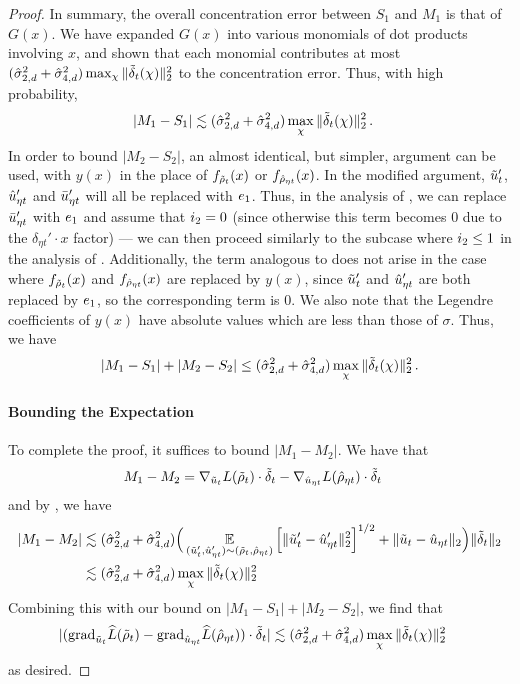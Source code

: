 \begin{proof}
In summary, the overall concentration error between $S_1$ and $M_1$ is that of $G(x)$. We have expanded $G(x)$ into various monomials of dot products involving $x$, and shown that each monomial contributes at most $(\hat{\sigma}_{2, d}^2 + \hat{\sigma}_{4, d}^2) \max_\chi \|{\tilde{\delta}}_t(\chi)\|_2^2$ to the concentration error. Thus, with high probability,
\begin{align}
|M_1 - S_1|
& \lesssim (\hat{\sigma}_{2, d}^2 + \hat{\sigma}_{4, d}^2) \max_\chi \|{\tilde{\delta}}_t(\chi)\|_2^2 \,.
\end{align}
In order to bound $|M_2 - S_2|$, an almost identical, but simpler, argument can be used, with $y(x)$ in the place of $f_{{\tilde{\rho}}_t}(x)$ or $f_{{\hat{\rho}}_{\eta t}}(x)$. In the modified argument, $\tilde{u}_t'$, $\hat{u}_{\eta t}'$ and $\bar{u}_{\eta t}'$ will all be replaced with $e_1$. Thus, in the analysis of , we can replace $\bar{u}_{\eta t}'$ with $e_1$ and assume that $i_{2} = 0$ (since otherwise this term becomes $0$ due to the $\delta_{\eta t}' \cdot x$ factor) --- we can then proceed similarly to the subcase where $i_{2} \leq 1$ in the analysis of . Additionally, the term analogous to  does not arise in the case where $f_{{\tilde{\rho}}_t}(x)$ and $f_{{\hat{\rho}}_{\eta t}}(x)$ are replaced by $y(x)$, since $\tilde{u}_t'$ and $\hat{u}_{\eta t}'$ are both replaced by $e_1$, so the corresponding term is $0$. We also note that the Legendre coefficients of $y(x)$ have absolute values which are less than those of $\sigma$. Thus, we have
\begin{align}
|M_1 - S_1| + |M_2 - S_2| \leq (\hat{\sigma}_{2, d}^2 + \hat{\sigma}_{4, d}^2) \max_\chi \|{\tilde{\delta}}_t(\chi)\|_2^2 \,.
\end{align}
\paragraph{Bounding the Expectation} To complete the proof, it suffices to bound $|M_1 - M_2|$. We have that
\begin{align}
M_1 - M_2
& = \nabla_{\tilde{u}_t} L({\tilde{\rho}}_t) \cdot {\tilde{\delta}}_t - \nabla_{\hat{u}_{\eta t}} L({\hat{\rho}}_{\eta t}) \cdot {\tilde{\delta}}_t
\end{align}
and by , we have
\begin{align}
|M_1 - M_2|
& \lesssim (\hat{\sigma}_{2, d}^2 + \hat{\sigma}_{4, d}^2) \Big(\operatorname*{\mathbb{E}}_{(\tilde{u}_t', \hat{u}_{\eta t}') \sim ({\tilde{\rho}}_t, {\hat{\rho}}_{\eta t})} \Big[\|\tilde{u}_t' - \hat{u}_{\eta t}'\|_2^2\Big]^{1/2} + \|\tilde{u}_t - \hat{u}_{\eta t}\|_2 \Big) \|{\tilde{\delta}}_t\|_2 \\
& \lesssim (\hat{\sigma}_{2, d}^2 + \hat{\sigma}_{4, d}^2) \max_\chi \|{\tilde{\delta}}_t (\chi)\|_2^2
\end{align}
Combining this with our bound on $|M_1 - S_1| + |M_2 - S_2|$, we find that
\begin{align}
|({\textup{grad}}_{\tilde{u}_t} \widehat{L}({\tilde{\rho}}_t) - {\textup{grad}}_{\hat{u}_{\eta t}} \widehat{L}({\hat{\rho}}_{\eta t})) \cdot {\tilde{\delta}}_t|
& \lesssim (\hat{\sigma}_{2, d}^2 + \hat{\sigma}_{4, d}^2) \max_\chi \|{\tilde{\delta}}_t (\chi)\|_2^2
\end{align}
as desired.
\end{proof}

